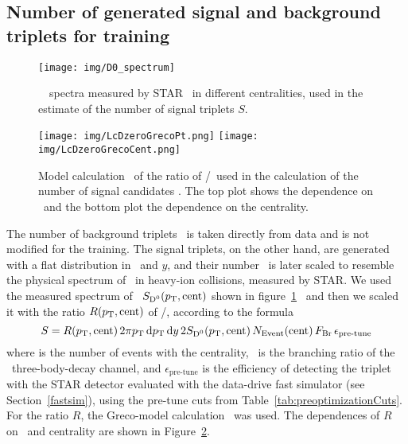 \subsection{Number of generated signal and background triplets for training}

\begin{figure}[!htb]
\centering
\texttt{[image: img/D0\_spectrum]}

\caption{\label{fig:D0spectrum}\dzero\ \pt\ spectra measured by STAR~\cite{D0paper} in different centralities, used in the estimate of the number of signal triplets $S$\@.}

\end{figure}

\begin{figure}[!htb]
\centering
\texttt{[image: img/LcDzeroGrecoPt.png]}
\texttt{[image: img/LcDzeroGrecoCent.png]}

\caption{\label{fig:greco}Model calculation~\cite{PlumariGreco} of the ratio of \Lambdac/\dzero\ used in the calculation of the number of signal candidates \Nsig\@. The top plot shows the dependence on \pt\ and the bottom plot the dependence on the centrality.}

\end{figure}

The number of background triplets \Nbkg{}\ is taken directly from data and is not modified for the training. The signal triplets, on the other hand, are generated with a flat distribution in \pt\ and $y$, and their number \Nsig{}\ is later scaled to resemble the physical spectrum of \Lambdac\ in heavy-ion collisions, measured by STAR\@. We used the measured spectrum of \dzero\  $S_{{\text{D}^0}}({p_{\mathrm{T}}}, \mathrm{cent})$ shown in figure~\ref{fig:D0spectrum}~\cite{D0paper} and then we scaled it with the ratio $R({p_{\mathrm{T}}}, \mathrm{cent})$ of \dzero/\Lambdac, according to the formula
\begin{equation}
 S = R({p_{\mathrm{T}}}, \mathrm{cent}) \,2\pi {p_{\mathrm{T}}} \,\mathrm{d}{p_{\mathrm{T}}} \,\mathrm{d} y \,2S_{{\text{D}^0}}({p_{\mathrm{T}}}, \mathrm{cent})\, N_\mathrm{Event}(\mathrm{cent})\, F_\mathrm{Br}\, \epsilon_\text{pre-tune}
\end{equation}
where \Nevt{} is the number of events with the centrality, \branching\ is the branching ratio of the \pKpi\ three-body-decay channel, and $\epsilon_\text{pre-tune}$ is the efficiency of detecting the triplet with the STAR detector evaluated with the data-drive fast simulator (see Section~\ref{fastsim}), using the pre-tune cuts from Table~\ref{tab:preoptimizationCuts}\@.
For the ratio $R$, the Greco-model calculation~\cite{PlumariGreco} was used. The dependences of $R$ on \pt\ and centrality are shown in Figure~\ref{fig:greco}\@.

